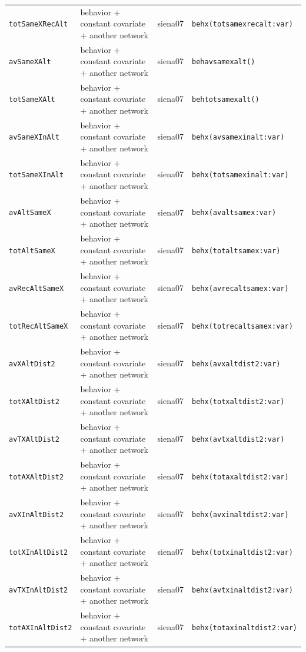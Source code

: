 \begin{longtable}{@{}p{2.6cm}p{3.2cm}p{2.9cm}p{5.4cm}@{}}
\texttt{totSameXRecAlt} & behavior + constant covariate + another network & siena07 & \texttt{behx(totsamexrecalt:var)}\\
\texttt{avSameXAlt} & behavior + constant covariate + another network & siena07 & \texttt{behavsamexalt()}\\
\texttt{totSameXAlt} & behavior + constant covariate + another network & siena07 & \texttt{behtotsamexalt()}\\
\texttt{avSameXInAlt} & behavior + constant covariate + another network & siena07 & \texttt{behx(avsamexinalt:var)}\\
\texttt{totSameXInAlt} & behavior + constant covariate + another network & siena07 & \texttt{behx(totsamexinalt:var)}\\
\texttt{avAltSameX} & behavior + constant covariate + another network & siena07 & \texttt{behx(avaltsamex:var)}\\
\texttt{totAltSameX} & behavior + constant covariate + another network & siena07 & \texttt{behx(totaltsamex:var)}\\
\texttt{avRecAltSameX} & behavior + constant covariate + another network & siena07 & \texttt{behx(avrecaltsamex:var)}\\
\texttt{totRecAltSameX} & behavior + constant covariate + another network & siena07 & \texttt{behx(totrecaltsamex:var)}\\
\texttt{avXAltDist2} & behavior + constant covariate + another network & siena07 & \texttt{behx(avxaltdist2:var)}\\
\texttt{totXAltDist2} & behavior + constant covariate + another network & siena07 & \texttt{behx(totxaltdist2:var)}\\
\texttt{avTXAltDist2} & behavior + constant covariate + another network & siena07 & \texttt{behx(avtxaltdist2:var)}\\
\texttt{totAXAltDist2} & behavior + constant covariate + another network & siena07 & \texttt{behx(totaxaltdist2:var)}\\
\texttt{avXInAltDist2} & behavior + constant covariate + another network & siena07 & \texttt{behx(avxinaltdist2:var)}\\
\texttt{totXInAltDist2} & behavior + constant covariate + another network & siena07 & \texttt{behx(totxinaltdist2:var)}\\
\texttt{avTXInAltDist2} & behavior + constant covariate + another network & siena07 & \texttt{behx(avtxinaltdist2:var)}\\
\texttt{totAXInAltDist2} & behavior + constant covariate + another network & siena07 & \texttt{behx(totaxinaltdist2:var)}\\

\end{longtable}
